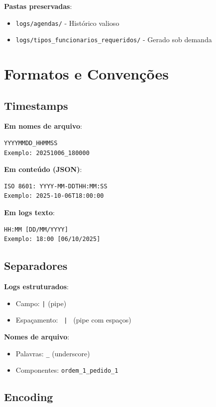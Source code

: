 \documentclass[11pt,a4paper]{article}
\begin{document}
\textbf{Pastas preservadas}:
\begin{itemize}
    \item \texttt{logs/agendas/} - Histórico valioso
    \item \texttt{logs/tipos\_funcionarios\_requeridos/} - Gerado sob demanda
\end{itemize}

\newpage

\section{Formatos e Convenções}

\subsection{Timestamps}

\textbf{Em nomes de arquivo}:
\begin{verbatim}
YYYYMMDD_HHMMSS
Exemplo: 20251006_180000
\end{verbatim}

\textbf{Em conteúdo (JSON)}:
\begin{verbatim}
ISO 8601: YYYY-MM-DDTHH:MM:SS
Exemplo: 2025-10-06T18:00:00
\end{verbatim}

\textbf{Em logs texto}:
\begin{verbatim}
HH:MM [DD/MM/YYYY]
Exemplo: 18:00 [06/10/2025]
\end{verbatim}

\subsection{Separadores}

\textbf{Logs estruturados}:
\begin{itemize}
    \item Campo: \texttt{|} (pipe)
    \item Espaçamento: \texttt{ | } (pipe com espaços)
\end{itemize}

\textbf{Nomes de arquivo}:
\begin{itemize}
    \item Palavras: \texttt{\_} (underscore)
    \item Componentes: \texttt{ordem\_1\_pedido\_1}
\end{itemize}

\subsection{Encoding}
\end{document}
